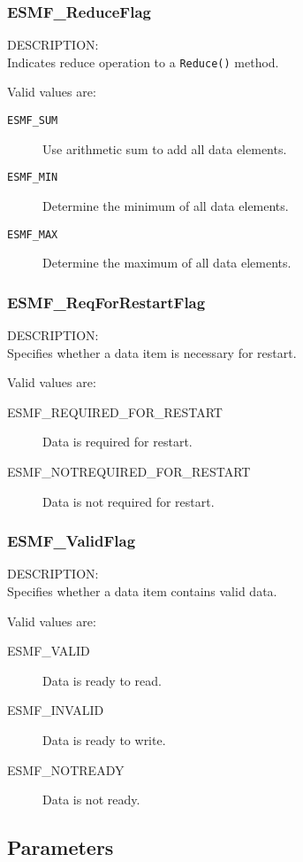 \subsubsection{ESMF\_ReduceFlag}
\label{opt:reduceflag}
{\sf DESCRIPTION:\\}
Indicates reduce operation to a {\tt Reduce()} method.

Valid values are:
\begin{description}
   \item [{\tt ESMF\_SUM}]
         Use arithmetic sum to add all data elements.
   \item [{\tt ESMF\_MIN}]
         Determine the minimum of all data elements.
   \item [{\tt ESMF\_MAX}]
         Determine the maximum of all data elements.
\end{description}

\subsubsection{ESMF\_ReqForRestartFlag}
\label{opt:reqforrestartflag}
{\sf DESCRIPTION:\\}
Specifies whether a data item is necessary for restart.

Valid values are:
\begin{description}
   \item [ESMF\_REQUIRED\_FOR\_RESTART] 
         Data is required for restart.
   \item [ESMF\_NOTREQUIRED\_FOR\_RESTART]
         Data is not required for restart.
\end{description}

\subsubsection{ESMF\_ValidFlag}
\label{opt:stateitemvalid}
{\sf DESCRIPTION:\\}
Specifies whether a data item contains valid data.

Valid values are:
\begin{description}
   \item [ESMF\_VALID] 
         Data is ready to read.
   \item [ESMF\_INVALID]
         Data is ready to write.
   \item [ESMF\_NOTREADY]
         Data is not ready.
\end{description}


\subsection{Parameters}

